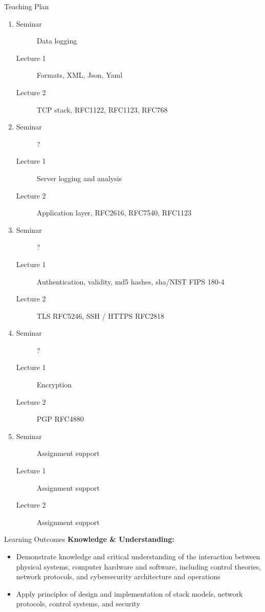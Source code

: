 \documentclass[xcolor=svgnames]{beamer}
\begin{document}
\begin{frame}[allowframebreaks]{Teaching Plan}
\begin{enumerate}[Week 1]
\begin{description}
    \end{description}
    \item  \begin{description}
        \item[Seminar] Data logging
        \item[Lecture 1] Formats, XML, Json, Yaml
        \item[Lecture 2] TCP stack, RFC1122, RFC1123, RFC768
    \end{description}
    \item  \begin{description}
        \item[Seminar] ?
        \item[Lecture 1] Server logging and analysis
        \item[Lecture 2] Application layer, RFC2616, RFC7540, RFC1123
    \end{description}
    \item  \begin{description}
        \item[Seminar] ?
        \item[Lecture 1] Authentication, validity, md5 hashes, sha/NIST FIPS 180-4
        \item[Lecture 2] TLS RFC5246, SSH / HTTPS RFC2818
    \end{description}
    \item  \begin{description}
        \item[Seminar] ?
        \item[Lecture 1] Encryption
        \item[Lecture 2]  PGP RFC4880
    \end{description}
    \item  \begin{description}
        \item[Seminar] Assignment support
        \item[Lecture 1] Assignment support
        \item[Lecture 2] Assignment support
    \end{description}
\end{enumerate}
\end{frame}

\begin{frame}{Learning Outcomes}
\textbf{Knowledge \& Understanding:}
\begin{itemize}
    \item  Demonstrate knowledge and critical
    understanding of the interaction
    between physical systems, computer
    hardware and software, including
    control theories, network protocols, and
    cybersecurity architecture and
    operations
    \item Apply principles of design and
    implementation of stack models,
    network protocols, control systems, and
    security
\end{itemize}
\end{frame}
\end{document}
